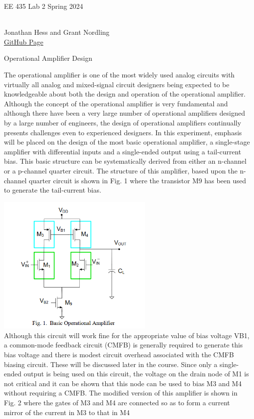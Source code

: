 \documentclass[10pt,a4paper]{article}
\author{}
\date{}
\begin{document}
\begin{flushleft}
\begin{LARGE}EE 435 Lab 2 Spring 2024
\end{LARGE}
\\Jonathan Hess and Grant Nordling
\\\href{https://github.com/Jetsama/EE435/tree/main/Labs/Lab2}{GitHub Page}
\end{flushleft}

\begin{LARGE}
Operational Amplifier Design
\end{LARGE}


The operational amplifier is one of the most widely used analog circuits with
virtually all analog and mixed-signal circuit designers being expected to be
knowledgeable about both the design and operation of the operational amplifier.
Although the concept of the operational amplifier is very fundamental and although there
have been a very large number of operational amplifiers designed by a large number of
engineers, the design of operational amplifiers continually presents challenges even to
experienced designers.
In this experiment, emphasis will be placed on the design of the most basic
operational amplifier, a single-stage amplifier with differential inputs and a single-ended
output using a tail-current bias. This basic structure can be systematically derived from
either an n-channel or a p-channel quarter circuit. The structure of this amplifier, based
upon the n-channel quarter circuit is shown in Fig. 1 where the transistor M9 has been
used to generate the tail-current bias.

\includegraphics[width=3in]{images/figure1.png} \\
Although this circuit will work fine for the appropriate value of bias voltage VB1,
a common-mode feedback circuit (CMFB) is generally required to generate this bias
voltage and there is modest circuit overhead associated with the CMFB biasing circuit.
These will be discussed later in the course.
Since only a single-ended output is being used on this circuit, the voltage on the
drain node of M1 is not critical and it can be shown that this node can be used to bias M3
and M4 without requiring a CMFB. The modified version of this amplifier is shown in
Fig. 2 where the gates of M3 and M4 are connected so as to form a current mirror of the
current in M3 to that in M4
\end{document}
